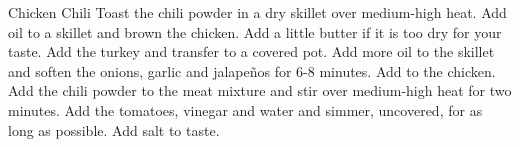 \begin{recipe}{Chicken Chili}{}{}
Toast the chili powder in a dry skillet over medium-high heat.
Add oil to a skillet and brown the chicken. Add a little butter if it is too dry for your taste.  Add the turkey and transfer to a covered pot. 
Add more oil to the skillet and soften the onions, garlic and jalape\~{n}os for 6-8 minutes.  Add to the chicken.
\newstep
Add the chili powder to the meat mixture and stir over medium-high heat for two minutes.
Add the tomatoes, vinegar and water and simmer, uncovered, for as long as possible.  Add salt to taste.
\end{recipe}
